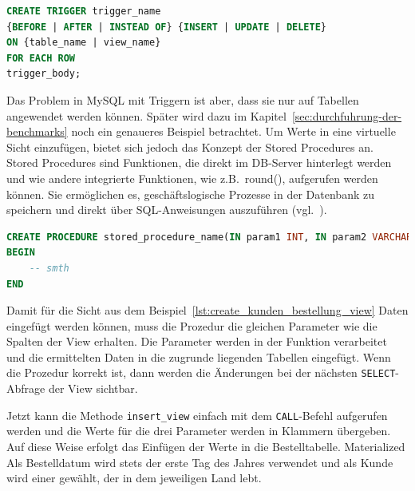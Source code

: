\vspace{-5pt}
\begin{lstlisting}[language=SQL,caption=Allgemeine Trigger Deklaration,label={lst:allg-trigger-dekl}]
CREATE TRIGGER trigger_name
{BEFORE | AFTER | INSTEAD OF} {INSERT | UPDATE | DELETE}
ON {table_name | view_name}
FOR EACH ROW
trigger_body;
\end{lstlisting}
\vspace{-5pt}

Das Problem in MySQL mit Triggern ist aber, dass sie nur auf Tabellen angewendet werden können.
Später wird dazu im Kapitel~\ref{sec:durchfuhrung-der-benchmarks} noch ein genaueres Beispiel betrachtet.
Um Werte in eine virtuelle Sicht einzufügen, bietet sich jedoch das Konzept der Stored Procedures an.
Stored Procedures sind Funktionen, die direkt im DB-Server hinterlegt werden und wie andere integrierte Funktionen, wie z.B.\ round(), aufgerufen werden können.
Sie ermöglichen es, geschäftslogische Prozesse in der Datenbank zu speichern und direkt über SQL-Anweisungen auszuführen (vgl.\ \cite[S. 173]{silberschatz2011database}).

\vspace{-5pt}
\begin{lstlisting}[language=SQL,caption=Allgemeine Prozedur Deklaration,label={lst:allg-stored-procedure-dekl}]
CREATE PROCEDURE stored_procedure_name(IN param1 INT, IN param2 VARCHAR(255))
BEGIN
    -- smth
END
\end{lstlisting}
\vspace{-5pt}

Damit für die Sicht aus dem Beispiel~\ref{lst:create_kunden_bestellung_view} Daten eingefügt werden können, muss die Prozedur die gleichen Parameter wie die Spalten der View erhalten.
Die Parameter werden in der Funktion verarbeitet und die ermittelten Daten in die zugrunde liegenden Tabellen eingefügt.
Wenn die Prozedur korrekt ist, dann werden die Änderungen bei der nächsten \texttt{SELECT}-Abfrage der View sichtbar.

\vspace{-5pt}


Jetzt kann die Methode \texttt{insert\_view} einfach mit dem \texttt{CALL}-Befehl aufgerufen werden und die Werte für die drei Parameter werden in Klammern übergeben.
Auf diese Weise erfolgt das Einfügen der Werte in die Bestelltabelle.
Materialized Als Bestelldatum wird stets der erste Tag des Jahres verwendet und als Kunde wird einer gewählt, der in dem jeweiligen Land lebt.

